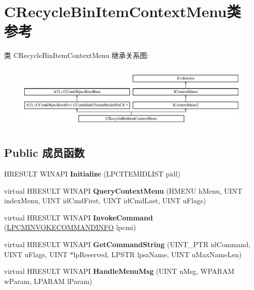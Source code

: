 \hypertarget{class_c_recycle_bin_item_context_menu}{}\section{C\+Recycle\+Bin\+Item\+Context\+Menu类 参考}
\label{class_c_recycle_bin_item_context_menu}
类 C\+Recycle\+Bin\+Item\+Context\+Menu 继承关系图\+:\begin{figure}[H]
\begin{center}
\leavevmode
\includegraphics[height=3.181818cm]{class_c_recycle_bin_item_context_menu}
\end{center}
\end{figure}
\subsection*{Public 成员函数}
\begin{DoxyCompactItemize}
\item 
\mbox{\label{class_c_recycle_bin_item_context_menu_a6c6a08c2e89f8a52ffabdde18fc961be}} 
H\+R\+E\+S\+U\+LT W\+I\+N\+A\+PI {\bfseries Initialize} (L\+P\+C\+I\+T\+E\+M\+I\+D\+L\+I\+ST pidl)
\item 
\mbox{\label{class_c_recycle_bin_item_context_menu_ac28058ad51c93c7eab585a5c6ace6e6b}} 
virtual H\+R\+E\+S\+U\+LT W\+I\+N\+A\+PI {\bfseries Query\+Context\+Menu} (H\+M\+E\+NU h\+Menu, U\+I\+NT index\+Menu, U\+I\+NT id\+Cmd\+First, U\+I\+NT id\+Cmd\+Last, U\+I\+NT u\+Flags)
\item 
\mbox{\label{class_c_recycle_bin_item_context_menu_a1ebebb4dc93e2767c757bf085910b7de}} 
virtual H\+R\+E\+S\+U\+LT W\+I\+N\+A\+PI {\bfseries Invoke\+Command} (\hyperlink{struct_i_context_menu_1_1tag_c_m_i_n_v_o_k_e_c_o_m_m_a_n_d_i_n_f_o}{L\+P\+C\+M\+I\+N\+V\+O\+K\+E\+C\+O\+M\+M\+A\+N\+D\+I\+N\+FO} lpcmi)
\item 
\mbox{\label{class_c_recycle_bin_item_context_menu_a40c974bddf6e43d286678ce8a5fe05ae}} 
virtual H\+R\+E\+S\+U\+LT W\+I\+N\+A\+PI {\bfseries Get\+Command\+String} (U\+I\+N\+T\+\_\+\+P\+TR id\+Command, U\+I\+NT u\+Flags, U\+I\+NT $\ast$lp\+Reserved, L\+P\+S\+TR lpsz\+Name, U\+I\+NT u\+Max\+Name\+Len)
\item 
\mbox{\label{class_c_recycle_bin_item_context_menu_ada9cb133428c38a1e1ea39130de552c0}} 
virtual H\+R\+E\+S\+U\+LT W\+I\+N\+A\+PI {\bfseries Handle\+Menu\+Msg} (U\+I\+NT u\+Msg, W\+P\+A\+R\+AM w\+Param, L\+P\+A\+R\+AM l\+Param)
\end{DoxyCompactItemize}
